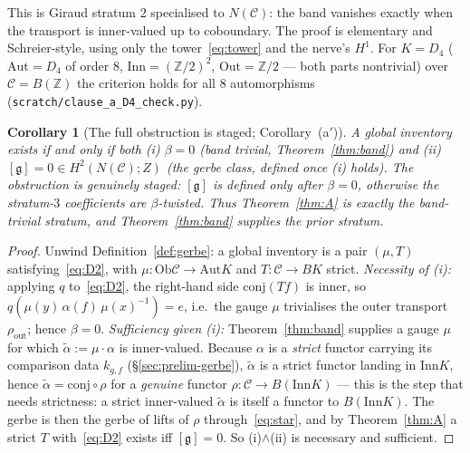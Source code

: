 \documentclass[11pt]{article}
\newtheorem{corollary}[theorem]{Corollary}
\theoremstyle{definition}
\newcommand{\C}{\mathcal{C}}
\newcommand{\Ob}{\mathrm{Ob}}
\newcommand{\Z}{\mathbb{Z}}
\newcommand{\Aut}{\mathrm{Aut}}
\newcommand{\Inn}{\mathrm{Inn}}
\newcommand{\Out}{\mathrm{Out}}
\newcommand{\Zc}{Z}
\newcommand{\gerbe}{\mathfrak{g}}
\begin{document}
This is Giraud stratum $2$ specialised to $N(\C)$: the band vanishes exactly when the transport is
inner-valued up to coboundary. The proof is elementary and Schreier-style, using only the
tower~\eqref{eq:tower} and the nerve's $H^1$. For $K=D_4$ ($\Aut=D_4$ of order $8$,
$\Inn=(\Z/2)^2$, $\Out=\Z/2$ --- both parts nontrivial) over $\C=B(\Z)$ the criterion holds for all
$8$ automorphisms (\texttt{scratch/clause\_a\_D4\_check.py}).

\begin{corollary}[The full obstruction is staged; Corollary~(a$'$)]\label{cor:aprime}
A global inventory exists if and only if \emph{both} \textup{(i)} $\beta=0$ (band trivial,
Theorem~\ref{thm:band}) and \textup{(ii)} $[\gerbe]=0\in H^2(N(\C);\Zc)$ (the gerbe class, defined
once (i) holds). The obstruction is genuinely staged: $[\gerbe]$ is defined only after $\beta=0$,
otherwise the stratum-$3$ coefficients are $\beta$-twisted. Thus Theorem~\ref{thm:A} is exactly the
band-trivial stratum, and Theorem~\ref{thm:band} supplies the prior stratum.
\end{corollary}

\begin{proof}
Unwind Definition~\ref{def:gerbe}: a global inventory is a pair $(\mu,T)$ satisfying~\eqref{eq:D2},
with $\mu:\Ob\C\to\Aut K$ and $T:\C\to BK$ strict. \emph{Necessity of (i):} applying $q$
to~\eqref{eq:D2}, the right-hand side $\mathrm{conj}(Tf)$ is inner, so
$q(\mu(y)\,\alpha(f)\,\mu(x)^{-1})=e$, i.e.\ the gauge $\mu$ trivialises the outer transport
$\rho_{\mathrm{out}}$; hence $\beta=0$. \emph{Sufficiency given (i):} Theorem~\ref{thm:band} supplies
a gauge $\mu$ for which $\tilde\alpha:=\mu\cdot\alpha$ is inner-valued. Because $\alpha$ is a
\emph{strict} functor carrying its comparison data $k_{g,f}$ (\S\ref{sec:prelim-gerbe}),
$\tilde\alpha$ is a strict functor landing in $\Inn K$, hence $\tilde\alpha=\mathrm{conj}\circ\rho$
for a \emph{genuine} functor $\rho:\C\to B(\Inn K)$ --- this is the step that needs strictness: a
strict inner-valued $\tilde\alpha$ is itself a functor to $B(\Inn K)$. The gerbe is then the gerbe of lifts of $\rho$
through~\eqref{eq:star}, and by Theorem~\ref{thm:A} a strict $T$ with~\eqref{eq:D2} exists iff
$[\gerbe]=0$. So (i)$\wedge$(ii) is necessary and sufficient.
\end{proof}
\end{document}
